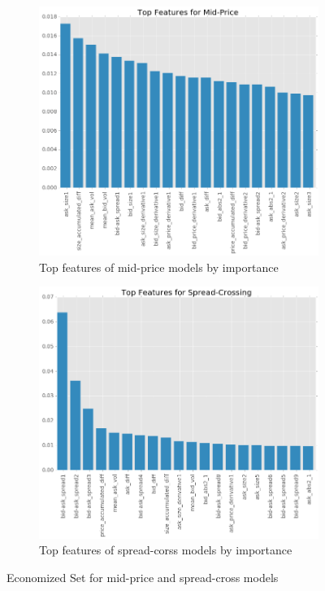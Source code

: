 \documentclass[11pt]{article}
\begin{document}
\begin{figure}[H]
\centering
\begin{subfigure}{.5\textwidth}
\centering
\includegraphics[width=0.95\linewidth,height=0.8\linewidth]{./figures/tree_mid_top_features.png}
\caption{Top features of mid-price models by importance}
\label{fig:mid_important}
\end{subfigure}%
\begin{subfigure}{.5\textwidth}
\centering
\includegraphics[width=0.95\linewidth,height=0.8\linewidth]{./figures/tree_spread_top_features.png}
\caption{Top features of spread-corss models by importance}
\label{fig:spread_important}
\end{subfigure}
\caption{Economized Set for mid-price and spread-cross models}
\label{fig:important}
\end{figure}
\end{document}
